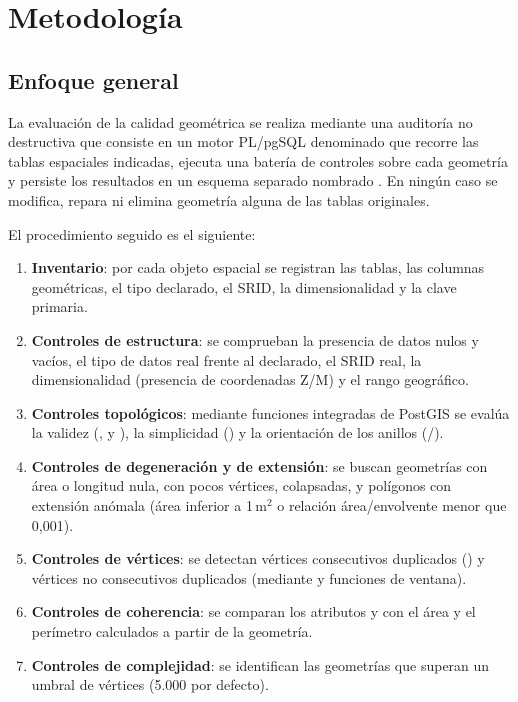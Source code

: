 \chapter{Metodología}
\label{ch:metodologia}

\section{Enfoque general}

La evaluación de la calidad geométrica se realiza mediante una auditoría no destructiva que consiste en un motor PL/pgSQL denominado  que recorre las tablas espaciales indicadas, ejecuta una batería de controles sobre cada geometría y persiste los resultados en un esquema separado nombrado . En ningún caso se modifica, repara ni elimina geometría alguna de las tablas originales.

El procedimiento seguido es el siguiente:

\begin{enumerate}[leftmargin=1.5em]
	\item \textbf{Inventario}: por cada objeto espacial se registran las tablas, las columnas geométricas, el tipo declarado, el SRID, la dimensionalidad y la clave primaria.
	\item \textbf{Controles de estructura}: se comprueban la presencia de datos nulos y vacíos, el tipo de datos real frente al declarado, el SRID real, la dimensionalidad (presencia de coordenadas Z/M) y el rango geográfico.
	\item \textbf{Controles topológicos}: mediante funciones integradas de PostGIS se evalúa la validez (,  y ), la simplicidad () y la orientación de los anillos (/).
	\item \textbf{Controles de degeneración y de extensión}: se buscan geometrías con área o longitud nula, con pocos vértices, colapsadas, y polígonos con extensión anómala (área inferior a 1\,m$^{2}$ o relación área/envolvente menor que 0,001).
	\item \textbf{Controles de vértices}: se detectan vértices consecutivos duplicados () y vértices no consecutivos duplicados (mediante  y funciones de ventana).
	\item \textbf{Controles de coherencia}: se comparan los atributos  y  con el área y el perímetro calculados a partir de la geometría.
	\item \textbf{Controles de complejidad}: se identifican las geometrías que superan un umbral de vértices (5.000 por defecto).
\end{enumerate}

